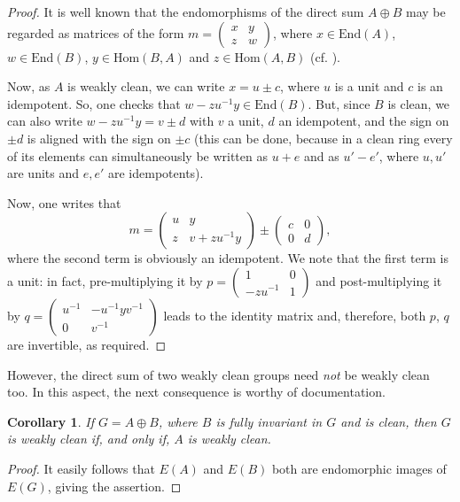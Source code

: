 \documentclass{amsart}
\newtheorem{corollary}[theorem]{Corollary}
\theoremstyle{definition}
\theoremstyle{remark}
\numberwithin{equation}{section}
\begin{document}
\begin{proof} It is well known that the endomorphisms of the direct sum $A\oplus B$ may be regarded as matrices of the form $m=\begin{pmatrix} x & y \\ z & w\end{pmatrix}$, where $x\in\mathrm{End}(A)$, $w\in\mathrm{End}(B)$, $y\in\mathrm{Hom}(B, A)$ and $z\in\mathrm{Hom}(A, B)$ (cf. \cite{F1}).

Now, as $A$ is weakly clean, we can write $x = u\pm c$, where $u$ is a unit and $c$ is an idempotent. So, one checks that $w-zu^{-1}y\in\mathrm{End}(B)$. But, since $B$ is clean, we can also write $w-zu^{-1}y=v\pm d$ with $v$ a unit,
$d$ an idempotent, and the sign on $\pm d$ is aligned with the sign on $\pm c$ (this can be done, because in a clean ring every of its elements can simultaneously be written as $u+e$ and as $u'-e'$, where $u,u'$ are units and $e,e'$ are idempotents).

Now, one writes that
$$m=\begin{pmatrix} u & y \\ z & v+zu^{-1}y\end{pmatrix}\pm\begin{pmatrix} c & 0 \\ 0 & d\end{pmatrix},$$
where the second term is obviously an idempotent. We note that the first term is a unit: in fact, pre-multiplying it by $p=\begin{pmatrix} 1 & 0 \\ -zu^{-1} & 1\end{pmatrix}$ and post-multiplying it by
$q=\begin{pmatrix} u^{-1} & -u^{-1}yv^{-1} \\ 0 & v^{-1}\end{pmatrix}$ leads to the identity matrix and, therefore, both $p$, $q$ are invertible, as required.
\end{proof}

However, the direct sum of two weakly clean groups need {\it not} be weakly clean too. In this aspect, the next consequence is worthy of documentation.

\begin{corollary}\label{fullinv}
If $G=A\oplus B$, where $B$ is fully invariant in $G$ and is clean, then $G$ is weakly clean if, and only if, $A$ is weakly clean.
\end{corollary}

\begin{proof} It easily follows that $E(A)$ and $E(B)$ both are endomorphic images of $E(G)$, giving the assertion.
\end{proof}
\end{document}
